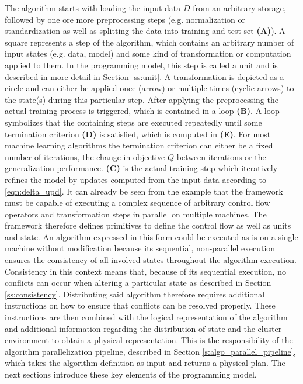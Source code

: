 The algorithm starts with loading the input data $D$ from an arbitrary storage, followed by one ore more preprocessing steps (e.g. normalization or standardization as well as splitting the data into training and test set \textbf{(A)}).
A square represents a step of the algorithm, which contains an arbitrary number of input states (e.g. data, model) and some kind of transformation or computation applied to them.
In the programming model, this step is called a unit and is described in more detail in Section \ref{ss:unit}.
A transformation is depicted as a circle and can either be applied once (arrow) or multiple times (cyclic arrows) to the state(s) during this particular step.
After applying the preprocessing the actual training process is triggered, which is contained in a loop \textbf{(B)}.
A loop symbolizes that the containing steps are executed repeatedly until some termination criterion \textbf{(D)} is satisfied, which is computed in \textbf{(E)}.
For most machine learning algorithms the termination criterion can either be a fixed number of iterations, the change in objective $Q$ between iterations or the generalization performance.
\textbf{(C)} is the actual training step which iteratively refines the model by updates computed from the input data according to \ref{eqn:delta_upd}.
It can already be seen from the example that the framework must be capable of executing a complex sequence of arbitrary control flow operators and transformation steps in parallel on multiple machines.
The framework therefore defines primitives to define the control flow as well as units and state.
An algorithm expressed in this form could be executed as is on a single machine without modification because its sequential, non-parallel execution ensures the consistency of all involved states throughout the algorithm execution.
Consistency in this context means that, because of its sequential execution, no conflicts can occur when altering a particular state as described in Section \ref{ss:consistency}.
Distributing said algorithm therefore requires additional instructions on how to ensure that conflicts can be resolved properly.
These instructions are then combined with the logical representation of the algorithm and additional information regarding the distribution of state and the cluster environment to obtain a physical representation.
This is the responsibility of the algorithm parallelization pipeline, described in Section \ref{s:algo_parallel_pipeline}, which takes the algorithm definition as input and returns a physical plan.
The next sections introduce these key elements of the programming model.

